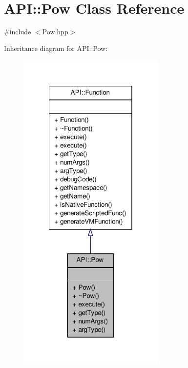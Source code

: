 \hypertarget{class_a_p_i_1_1_pow}{\section{A\-P\-I\-:\-:Pow Class Reference}
\label{class_a_p_i_1_1_pow}
}


{\ttfamily \#include $<$Pow.\-hpp$>$}



Inheritance diagram for A\-P\-I\-:\-:Pow\-:
\nopagebreak
\begin{figure}[H]
\begin{center}
\leavevmode
\includegraphics[width=206pt]{class_a_p_i_1_1_pow__inherit__graph}
\end{center}
\end{figure}



